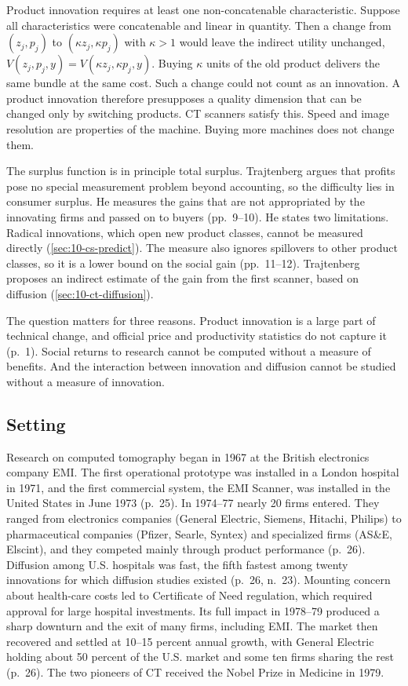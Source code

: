 Product innovation requires at least one non-concatenable characteristic. Suppose all characteristics were
concatenable and linear in quantity. Then a change from $(z_j,p_j)$ to $(\kappa z_j,\kappa p_j)$ with
$\kappa > 1$ would leave the indirect utility unchanged, $V(z_j,p_j,y) = V(\kappa z_j,\kappa p_j,y)$. Buying $\kappa$ units of the old
product delivers the same bundle at the same cost. Such a change could not count as an innovation. A product
innovation therefore presupposes a quality dimension that can be changed only by switching products. CT scanners
satisfy this. Speed and image resolution are properties of the machine. Buying more machines does not change
them.

 The surplus function is in principle total surplus. Trajtenberg argues that profits pose no
special measurement problem beyond accounting, so the difficulty lies in consumer surplus. He measures the gains
that are not appropriated by the innovating firms and passed on to buyers (pp.~9--10). He states two limitations.
Radical innovations, which open new product classes, cannot be measured directly (\cref{sec:10-cs-predict}). The
measure also ignores spillovers to other product classes, so it is a lower bound on the social gain (pp.~11--12).
Trajtenberg proposes an indirect estimate of the gain from the first scanner, based on diffusion
(\cref{sec:10-ct-diffusion}).

The question matters for three reasons. Product innovation is a large part of technical change, and official
price and productivity statistics do not capture it (p.~1). Social returns to research cannot be computed without
a measure of benefits. And the interaction between innovation and diffusion cannot be studied without a measure of
innovation.

\subsection{Setting}\label{sec:10-ct-setting}

Research on computed tomography began in 1967 at the British electronics company EMI. The first operational
prototype was installed in a London hospital in 1971, and the first commercial system, the EMI Scanner, was
installed in the United States in June 1973 (p.~25). In 1974--77 nearly 20 firms entered. They ranged from
electronics companies (General Electric, Siemens, Hitachi, Philips) to pharmaceutical companies (Pfizer, Searle,
Syntex) and specialized firms (AS\&E, Elscint), and they competed mainly through product performance (p.~26).
Diffusion among U.S. hospitals was fast, the fifth fastest among twenty innovations for which diffusion studies
existed (p.~26, n.~23). Mounting concern about health-care costs led to Certificate of Need regulation, which
required approval for large hospital investments. Its full impact in 1978--79 produced a sharp downturn and the
exit of many firms, including EMI. The market then recovered and settled at 10--15 percent annual growth, with
General Electric holding about 50 percent of the U.S. market and some ten firms sharing the rest (p.~26). The two
pioneers of CT received the Nobel Prize in Medicine in 1979.

